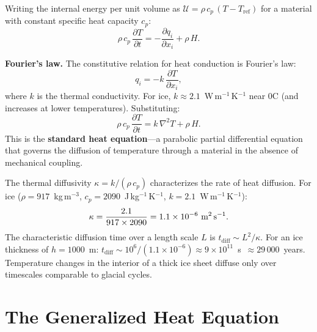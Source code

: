 \documentclass[11pt]{article}
\begin{document}
\medskip
\noindent Writing the internal energy per unit volume as $\mathcal{U} = \rho\,c_p\,(T - T_{\text{ref}})$ for a material with constant specific heat capacity $c_p$:
\begin{equation}
  \rho\,c_p\,\frac{\partial T}{\partial t} = -\frac{\partial q_i}{\partial x_i} + \rho\,H.
  \label{eq:energy_balance}
\end{equation}

\noindent\textbf{Fourier's law.}  The constitutive relation for heat conduction is Fourier's law:
\begin{equation}
  q_i = -k\,\frac{\partial T}{\partial x_i},
  \label{eq:fourier}
\end{equation}
where $k$ is the thermal conductivity.  For ice, $k \approx 2.1$~W\,m$^{-1}$\,K$^{-1}$ near 0\textdegree C (and increases at lower temperatures).  Substituting:
\begin{equation}
  \boxed{\rho\,c_p\,\frac{\partial T}{\partial t} = k\,\nabla^2 T + \rho\,H.}
  \label{eq:heat_equation}
\end{equation}
This is the \textbf{standard heat equation}---a parabolic partial differential equation that governs the diffusion of temperature through a material in the absence of mechanical coupling.

\medskip
\noindent The thermal diffusivity $\kappa = k / (\rho\,c_p)$ characterizes the rate of heat diffusion.  For ice ($\rho = 917$~kg\,m$^{-3}$, $c_p = 2090$~J\,kg$^{-1}$\,K$^{-1}$, $k = 2.1$~W\,m$^{-1}$\,K$^{-1}$):
\begin{equation}
  \kappa = \frac{2.1}{917 \times 2090} = 1.1 \times 10^{-6} \text{ m}^2\text{\,s}^{-1}.
\end{equation}
The characteristic diffusion time over a length scale $L$ is $t_{\text{diff}} \sim L^2 / \kappa$.  For an ice thickness of $h = 1000$~m: $t_{\text{diff}} \sim 10^{6}/(1.1 \times 10^{-6}) \approx 9 \times 10^{11}$~s~$\approx 29\,000$~years.  Temperature changes in the interior of a thick ice sheet diffuse only over timescales comparable to glacial cycles.

\clearpage
\section{The Generalized Heat Equation}
\label{app:generalized_heat}
\end{document}
